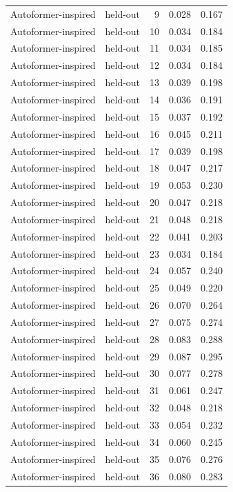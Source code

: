 \begin{tabular}{llrrr}
Autoformer-inspired & held-out & 9 & 0.028 & 0.167 \\
Autoformer-inspired & held-out & 10 & 0.034 & 0.184 \\
Autoformer-inspired & held-out & 11 & 0.034 & 0.185 \\
Autoformer-inspired & held-out & 12 & 0.034 & 0.184 \\
Autoformer-inspired & held-out & 13 & 0.039 & 0.198 \\
Autoformer-inspired & held-out & 14 & 0.036 & 0.191 \\
Autoformer-inspired & held-out & 15 & 0.037 & 0.192 \\
Autoformer-inspired & held-out & 16 & 0.045 & 0.211 \\
Autoformer-inspired & held-out & 17 & 0.039 & 0.198 \\
Autoformer-inspired & held-out & 18 & 0.047 & 0.217 \\
Autoformer-inspired & held-out & 19 & 0.053 & 0.230 \\
Autoformer-inspired & held-out & 20 & 0.047 & 0.218 \\
Autoformer-inspired & held-out & 21 & 0.048 & 0.218 \\
Autoformer-inspired & held-out & 22 & 0.041 & 0.203 \\
Autoformer-inspired & held-out & 23 & 0.034 & 0.184 \\
Autoformer-inspired & held-out & 24 & 0.057 & 0.240 \\
Autoformer-inspired & held-out & 25 & 0.049 & 0.220 \\
Autoformer-inspired & held-out & 26 & 0.070 & 0.264 \\
Autoformer-inspired & held-out & 27 & 0.075 & 0.274 \\
Autoformer-inspired & held-out & 28 & 0.083 & 0.288 \\
Autoformer-inspired & held-out & 29 & 0.087 & 0.295 \\
Autoformer-inspired & held-out & 30 & 0.077 & 0.278 \\
Autoformer-inspired & held-out & 31 & 0.061 & 0.247 \\
Autoformer-inspired & held-out & 32 & 0.048 & 0.218 \\
Autoformer-inspired & held-out & 33 & 0.054 & 0.232 \\
Autoformer-inspired & held-out & 34 & 0.060 & 0.245 \\
Autoformer-inspired & held-out & 35 & 0.076 & 0.276 \\
Autoformer-inspired & held-out & 36 & 0.080 & 0.283 \\

\end{tabular}
